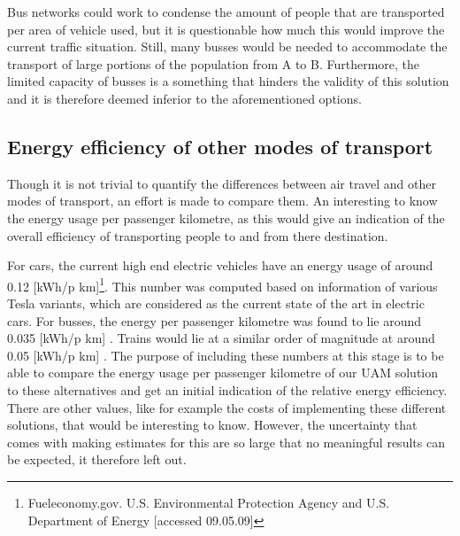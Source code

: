 Bus networks could work to condense the amount of people that are transported per area of vehicle used, but it is questionable how much this would improve the current traffic situation. Still, many busses would be needed to accommodate the transport of large portions of the population from A to B. Furthermore, the limited capacity of busses is a something that hinders the validity of this solution and it is therefore deemed inferior to the aforementioned options.  


\subsection{Energy efficiency of other modes of transport}
Though it is not trivial to quantify the differences between air travel and other modes of transport, an effort is made to compare them. An interesting to know the energy usage per passenger kilometre, as this would give an indication of the overall efficiency of transporting people to and from there destination.

For cars, the current high end electric vehicles have an energy usage of around 0.12 [kWh/p km]\footnote{Fueleconomy.gov. U.S. Environmental Protection Agency and U.S. Department of Energy [accessed 09.05.09]}. This number was computed based on information of various Tesla variants, which are considered as the current state of the art in electric cars. For busses, the energy per passenger kilometre was found to lie around 0.035 [kWh/p km] \cite{TNOstuff} \citep{Latvianstuff}. Trains would lie at a similar order of magnitude at around 0.05 [kWh/p km] \cite{Trainstuff}. The purpose of including these numbers at this stage is to be able to compare the energy usage per passenger kilometre of our UAM solution to these alternatives and get an initial indication of the relative energy efficiency. There are other values, like for example the costs of implementing these different solutions, that would be interesting to know. However, the uncertainty that comes with making estimates for this are so large that no meaningful results can be expected, it therefore left out. 









